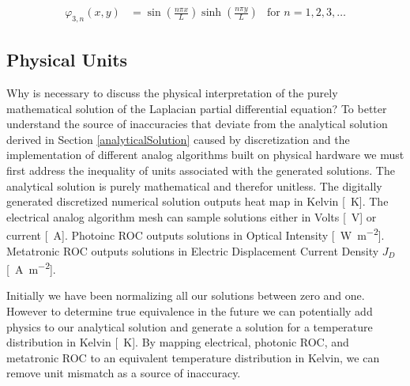 \begin{equation}\label{eq:sovSol_a}
\begin{aligned} 
\varphi _ { 3 , n } \left( x , y \right) & 
= \sin \left( \frac { n \pi x } { L } \right) \sinh \left(\frac { n \pi y } { L } \right)
& \text{for } n=1,2,3,\dots
\end{aligned}
\end{equation}

\subsection{Physical Units}\label{physicalUnits}
Why is necessary to discuss the physical interpretation of the purely mathematical solution of the Laplacian partial differential equation? To better understand the source of inaccuracies that deviate from the analytical solution derived in Section \ref{analyticalSolution} caused by discretization and the implementation of different analog algorithms built on physical hardware we must first address the inequality of units associated with the generated solutions. The analytical solution is purely mathematical and therefor unitless. The digitally generated discretized numerical solution outputs heat map in Kelvin [\SI{}{\kelvin}]. The electrical analog algorithm mesh can sample solutions either in Volts [\SI{}{\volt}] or current [\SI{}{\ampere}]. Photoinc ROC outputs solutions in Optical Intensity [\SI{}{\watt \meter^{-2}}]. Metatronic ROC outputs solutions in Electric Displacement Current Density $J_D$ [\SI{}{\ampere \meter^{-2}}].
\par Initially we have been normalizing all our solutions between zero and one. However to determine true equivalence in the future we can potentially add physics to our analytical solution and generate a solution for a temperature distribution in Kelvin [\SI{}{\kelvin}]. By mapping electrical, photonic ROC, and metatronic ROC to an equivalent temperature distribution in Kelvin, we can remove unit mismatch as a source of inaccuracy.